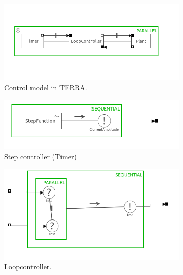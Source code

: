 \documentclass[a4paper,twoside,11pt]{article}
\begin{document}
\begin{figure}
	\centering
	\begin{subfigure}{0.5\textwidth}
	 \centering
	 \includegraphics[width=\textwidth]{./images/3-1_csp_overview.png}
	 \caption{Control model in TERRA.}
	 \label{fig:3_1_csp_overview}
	\end{subfigure}%
	\begin{subfigure}{0.5\textwidth}
	 \centering
	 \includegraphics[width=\textwidth]{./images/3-1_csp_step.png}
	 \caption{Step controller (Timer)}
	 \label{fig:3_1_csp_step}
	\end{subfigure}
	\begin{subfigure}{0.5\textwidth}
	 \centering
	 \includegraphics[width=\textwidth]{./images/3-1_csp_controller.png}
	 \caption{Loopcontroller.}
	 \label{fig:3_1_csp_controller}
	\end{subfigure}%
	\begin{subfigure}{0.5\textwidth}

\end{subfigure}
\end{figure}
\end{document}
